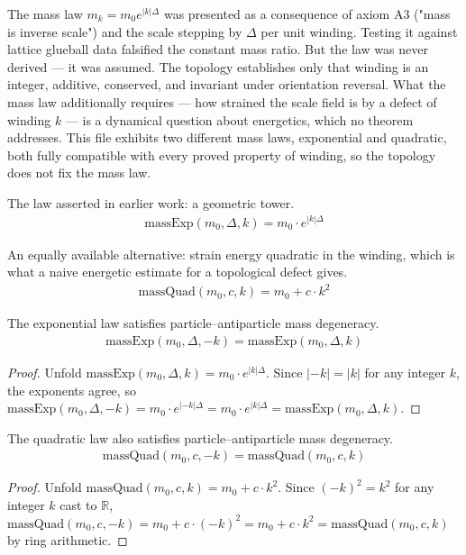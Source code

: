 The mass law $m_k = m_0 e^{|k|\Delta}$ was presented as a consequence of axiom A3 ("mass is inverse scale") and the scale stepping by $\Delta$ per unit winding.  Testing it against lattice glueball data falsified the constant mass ratio.  But the law was never derived — it was assumed.  The topology establishes only that winding is an integer, additive, conserved, and invariant under orientation reversal.  What the mass law additionally requires — how strained the scale field is by a defect of winding $k$ — is a dynamical question about energetics, which no theorem addresses.  This file exhibits two different mass laws, exponential and quadratic, both fully compatible with every proved property of winding, so the topology does not fix the mass law.

\begin{definition}
The law asserted in earlier work: a geometric tower.
\begin{align*}
\text{massExp}(m_0, \Delta, k) = m_0 \cdot e^{|k|\Delta}
\end{align*}
\end{definition}

\begin{definition}
An equally available alternative: strain energy quadratic in the winding, which is what a naive energetic estimate for a topological defect gives.
\begin{align*}
\text{massQuad}(m_0, c, k) = m_0 + c \cdot k^2
\end{align*}
\end{definition}

\begin{proposition}
The exponential law satisfies particle–antiparticle mass degeneracy.
\begin{align*}
\text{massExp}(m_0, \Delta, -k) = \text{massExp}(m_0, \Delta, k)
\end{align*}
\begin{proof}
Unfold $\text{massExp}(m_0,\Delta,k) = m_0\cdot e^{|k|\Delta}$. Since $|-k|=|k|$ for any integer $k$, the exponents agree, so $\text{massExp}(m_0,\Delta,-k) = m_0\cdot e^{|-k|\Delta} = m_0\cdot e^{|k|\Delta} = \text{massExp}(m_0,\Delta,k)$.
\end{proof}
\end{proposition}

\begin{proposition}
The quadratic law also satisfies particle–antiparticle mass degeneracy.
\begin{align*}
\text{massQuad}(m_0, c, -k) = \text{massQuad}(m_0, c, k)
\end{align*}
\begin{proof}
Unfold $\text{massQuad}(m_0,c,k) = m_0+c\cdot k^2$. Since $(-k)^2=k^2$ for any integer $k$ cast to $\mathbb{R}$, $\text{massQuad}(m_0,c,-k) = m_0 + c\cdot(-k)^2 = m_0+c\cdot k^2 = \text{massQuad}(m_0,c,k)$ by ring arithmetic.
\end{proof}
\end{proposition}

